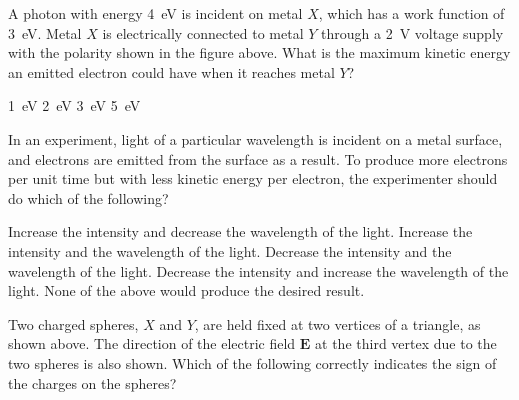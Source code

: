 \documentclass[12pt]{exam}
\newcommand{\pic}[2]{
  \begin{center}
    \texttt{[image: \#2]}
  \end{center}
}
\begin{document}
\begin{questions}
  \uplevel{
    \vspace{-.3in}
    \pic{.3}{photoelectric1}
  }
  \question\vspace{-.2in}A photon with energy \SI{4}{\electronvolt} is incident
  on metal $X$, which has a work function of \SI{3}{\electronvolt}. Metal $X$ is
  electrically connected to metal $Y$ through a \SI{2}{\volt} voltage supply
  with the polarity shown in the figure above. What is the maximum kinetic
  energy an emitted electron could have when it reaches metal $Y$?
  \begin{choices}
    \choice \SI{1}{\electronvolt}
    \choice \SI{2}{\electronvolt}
    \choice \SI{3}{\electronvolt}
    \choice \SI{5}{\electronvolt}
  \end{choices}

  \question In an experiment, light of a particular wavelength is incident on
  a metal surface, and electrons are emitted from the surface as a result. To
  produce more electrons per unit time but with less kinetic energy per
  electron, the experimenter should do which of the following?
  \begin{choices}
    \choice Increase the intensity and decrease the wavelength of the light.
    \choice Increase the intensity and the wavelength of the light.
    \choice Decrease the intensity and the wavelength of the light.
    \choice Decrease the intensity and increase the wavelength of the light.
    \choice None of the above would produce the desired result.
  \end{choices}
  
  \question\vspace{-.1in}Two charged spheres, $X$ and $Y$, are held fixed at
  two vertices of
  a triangle, as shown above. The direction of the electric field $\bm{E}$ at
  the third vertex due to the two spheres is also shown. Which of the following
  correctly indicates the sign of the charges on the spheres?


\end{questions}
\end{document}
